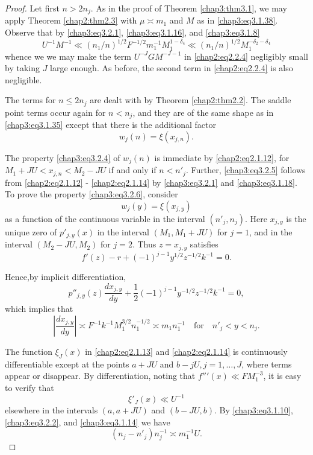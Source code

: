 \begin{proof}
Let first $n>2n_j$. As in the proof of Theorem \ref{chap3:thm3.1}, we
may apply Theorem \ref{chap2:thm2.3} with $\mu\asymp m_1$ and $M$ as
in \eqref{chap3:eq3.1.38}. Observe that by \eqref{chap3:eq3.2.1},
\eqref{chap3:eq3.1.16}, and \eqref{chap3:eq3.1.8}
$$
U^{-1}M^{-1}\ll \left(n_1/n\right)^{1/2}F^{-1/2}m_1^{-1}
M_1^{1-\delta_4}\ll\left(n_1/n\right)^{1/2}M_1^{-\delta_2-\delta_4}
$$
whence we we may make the term $U^{-J}GM^{-J-1}$ in
\eqref{chap2:eq2.2.4} negligibly small by taking $J$ large enough. As
before, the second term in \eqref{chap2:eq2.2.4} is also negligible.

The terms for $n\leq 2n_j$ are dealt with by Theorem
\ref{chap2:thm2.2}. The saddle point terms occur again for $n<n_j$,
and they are of the same shape as in \eqref{chap3:eq3.1.35} except
that there is the additional factor 
\begin{equation}\label{chap3:eq3.2.9}
w_j(n)=\xi\left(x_{j,n}\right).
\end{equation}

The property \eqref{chap3:eq3.2.4} of $w_j(n)$ is immediate by
\eqref{chap2:eq2.1.12}, for $M_1+JU < x_{j,n} < M_2-JU$ if and only if
$n<n'_j$. Further, \eqref{chap3:eq3.2.5} follows from
\eqref{chap2:eq2.1.12} - \eqref{chap2:eq2.1.14} by
\eqref{chap3:eq3.2.1} and \eqref{chap3:eq3.1.18}. To prove the
property \eqref{chap3:eq3.2.6}, consider
$$
w_j(y)=\xi\left(x_{j,y}\right)
$$
as a function of the continuous variable in the interval
$(n'_j,n_j)$. Here $x_{j,y}$ is the unique zero of $p'_{j,y}(x)$ in
the interval $(M_1,M_1+JU)$ for $j=1$, and in the interval
$(M_2-JU,M_2)$ for $j=2$. Thus $z=x_{j,y}$ satisfies
$$
f'(z)-r+(-1)^{j-1}y^{1/2}z^{-1/2}k^{-1}=0.
$$

Hence,\pageoriginale by implicit differentiation,
$$
p''_{j,y}(z)\frac{dx_{j,y}}{dy}+\frac{1}{2}(-1)^{j-1}y^{-1/2}
z^{-1/2}k^{-1}=0,
$$
which implies that 
\begin{equation}\label{chap3:eq3.2.10}
\left|\frac{dx_{j,y}}{dy}\right|\asymp F^{-1}k^{-1}M_1^{3/2}n_1^{-1/2}
\asymp m_1n_1^{-1}\quad\text{for}\quad n'_j<y<n_j.
\end{equation}

The function $\xi_J(x)$ in \eqref{chap2:eq2.1.13} and
\eqref{chap2:eq2.1.14} is continuously differentiable except at the
points $a+JU$ and $b-jU, j=1,\ldots,J$, where terms appear or
disappear. By differentiation, noting that ${f''}'(x)\ll FM_1^{-3}$,
it is easy to verify that 
\begin{equation}\label{chap3:eq3.2.11}
\xi'_J(x)\ll U^{-1}
\end{equation}
elsewhere in the intervals $(a,a+JU)$ and $(b-JU,b)$. By
\eqref{chap3:eq3.1.10}, \eqref{chap3:eq3.2.2}, and
\eqref{chap3:eq3.1.14} we have 
\begin{equation}\label{chap3:eq3.2.12}
\left(n_j-n'_j\right)n_j^{-1}\asymp m_1^{-1}U.
\end{equation}


\end{proof}
